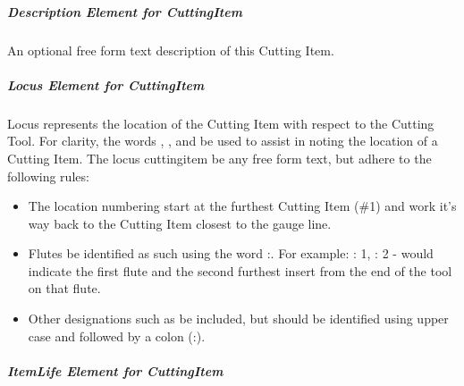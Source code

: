 \documentclass{mtconnect}	%
\begin{document}
\subparagraph{Description Element for CuttingItem}\mbox{}

An optional free form text description of this Cutting Item. 

\subparagraph{Locus Element for CuttingItem}\mbox{}

Locus represents the location of the Cutting Item with respect to the Cutting Tool.  For clarity, the words , , and  \SHOULD be used to assist in noting the location of a Cutting Item.  The \gls{locus cuttingitem} \MAY be any free form text, but \SHOULD adhere to the following rules: 

\begin{itemize}
    \item  The location numbering \SHOULD start at the furthest Cutting Item (\#1) and work it's way back to the Cutting Item closest to the gauge line. 
    \item Flutes \SHOULD be identified as such using the word :. For example: 
    \tab {}: 1, : 2 - would indicate the first flute and the second furthest insert from the end of the tool on that flute.
    \item Other designations such as  \MAY be included, but should be identified using upper case and followed by a colon (:).
\end{itemize}

\subparagraph{ItemLife Element for CuttingItem}\mbox{}
\end{document}
